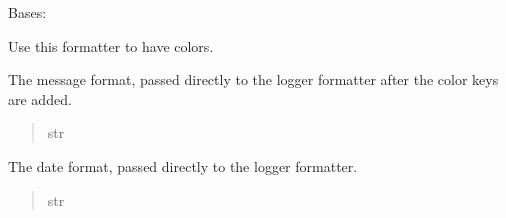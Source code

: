 \documentclass[letterpaper,11pt,english]{sphinxmanual}
\begin{document}
\begin{savenotes}\begin{fulllineitems}
\label{\detokenize{code/lezargus.library.logging:lezargus.library.logging.ColoredLogFormatter}}
\pysigstartsignatures
{}
\pysigstopsignatures
\sphinxAtStartPar
Bases: 

\sphinxAtStartPar
Use this formatter to have colors.

\begin{savenotes}\begin{fulllineitems}
\label{\detokenize{code/lezargus.library.logging:lezargus.library.logging.ColoredLogFormatter.message_format}}
\pysigstartsignatures
{}
\pysigstopsignatures
\sphinxAtStartPar
The message format, passed directly to the logger formatter after
the color keys are added.
\begin{quote}\begin{description}
\sphinxAtStartPar
str

\end{description}\end{quote}

\end{fulllineitems}\end{savenotes}


\begin{savenotes}\begin{fulllineitems}
\label{\detokenize{code/lezargus.library.logging:lezargus.library.logging.ColoredLogFormatter.date_format}}
\pysigstartsignatures
{}
\pysigstopsignatures
\sphinxAtStartPar
The date format, passed directly to the logger formatter.
\begin{quote}\begin{description}
\sphinxAtStartPar
str


\end{description}
\end{quote}
\end{fulllineitems}
\end{savenotes}
\end{fulllineitems}
\end{savenotes}
\end{document}
